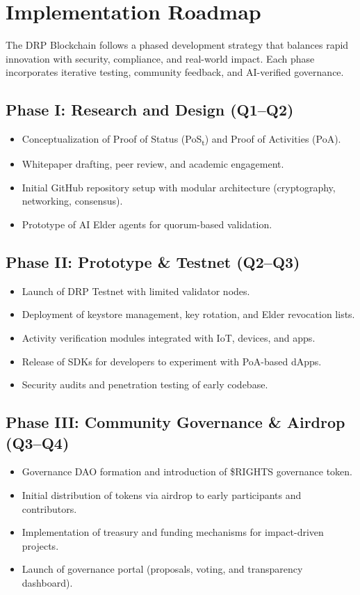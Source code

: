 \documentclass[11pt,a4paper]{article}
\begin{document}
\section{Implementation Roadmap}

The DRP Blockchain follows a phased development strategy that balances rapid innovation with security, compliance, and real-world impact. Each phase incorporates iterative testing, community feedback, and AI-verified governance.

\subsection{Phase I: Research and Design (Q1–Q2)}
\begin{itemize}
    \item Conceptualization of Proof of Status (PoS\textsubscript{t}) and Proof of Activities (PoA).  
    \item Whitepaper drafting, peer review, and academic engagement.  
    \item Initial GitHub repository setup with modular architecture (cryptography, networking, consensus).  
    \item Prototype of AI Elder agents for quorum-based validation.  
\end{itemize}

\subsection{Phase II: Prototype \& Testnet (Q2–Q3)}
\begin{itemize}
    \item Launch of DRP Testnet with limited validator nodes.  
    \item Deployment of keystore management, key rotation, and Elder revocation lists.  
    \item Activity verification modules integrated with IoT, devices, and apps.  
    \item Release of SDKs for developers to experiment with PoA-based dApps.  
    \item Security audits and penetration testing of early codebase.  
\end{itemize}

\subsection{Phase III: Community Governance \& Airdrop (Q3–Q4)}
\begin{itemize}
    \item Governance DAO formation and introduction of \$RIGHTS governance token.  
    \item Initial distribution of tokens via airdrop to early participants and contributors.  
    \item Implementation of treasury and funding mechanisms for impact-driven projects.  
    \item Launch of governance portal (proposals, voting, and transparency dashboard).  
\end{itemize}
\end{document}
